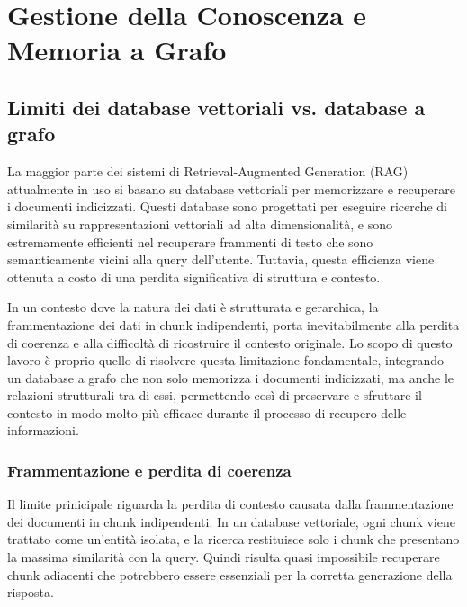 \newpage\pagestyle{main}

\chapter{Gestione della Conoscenza e Memoria a Grafo}\label{chap:second}

\inlineminitoc

\section{Limiti dei database vettoriali vs. database a grafo}

La maggior parte dei sistemi di Retrieval-Augmented Generation (RAG) \cite{rag_original} attualmente in uso si basano su database vettoriali per memorizzare e recuperare i documenti indicizzati. Questi database sono progettati per eseguire ricerche di similarità su rappresentazioni vettoriali ad alta dimensionalità, e sono estremamente efficienti nel recuperare frammenti di testo che sono semanticamente vicini alla query dell'utente. Tuttavia, questa efficienza viene ottenuta a costo di una perdita significativa di struttura e contesto.

In un contesto dove la natura dei dati è strutturata e gerarchica, la frammentazione dei dati in chunk indipendenti, porta inevitabilmente alla perdita di coerenza e alla difficoltà di ricostruire il contesto originale. Lo scopo di questo lavoro è proprio quello di risolvere questa limitazione fondamentale, integrando un database a grafo che non solo memorizza i documenti indicizzati, ma anche le relazioni strutturali tra di essi, permettendo così di preservare e sfruttare il contesto in modo molto più efficace durante il processo di recupero delle informazioni.

\subsection{Frammentazione e perdita di coerenza}

Il limite prinicipale riguarda la perdita di contesto causata dalla frammentazione dei documenti in chunk indipendenti. In un database vettoriale, ogni chunk viene trattato come un'entità isolata, e la ricerca restituisce solo i chunk che presentano la massima similarità con la query. Quindi risulta quasi impossibile recuperare chunk adiacenti che potrebbero essere essenziali per la corretta generazione della risposta.

